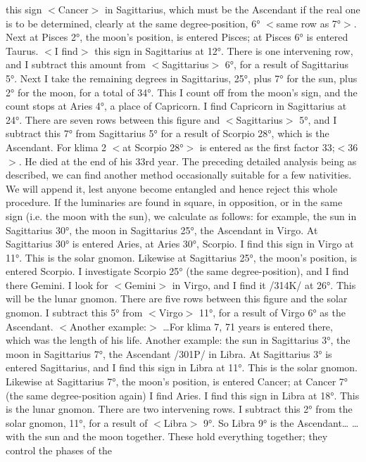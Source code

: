 this sign $<$Cancer$>$ in Sagittarius, which must be the Ascendant if the real one is to be determined, clearly
at the same degree-position, 6° $<$same row as 7°$>$. Next at Pisces 2°, the moon’s position, is entered
Pisces; at Pisces 6° is entered Taurus. $<$I find$>$ this sign in Sagittarius at 12°. There is one intervening
row, and I subtract this amount from $<$Sagittarius$>$ 6°, for a result of Sagittarius 5°. Next I take the
remaining degrees in Sagittarius, 25°, plus 7° for the sun, plus 2° for the moon, for a total of 34°. This I
count off from the moon’s sign, and the count stops at Aries 4°, a place of Capricorn. I find Capricorn in
Sagittarius at 24°. There are seven rows between this figure and $<$Sagittarius$>$ 5°, and I subtract this 7°
from Sagittarius 5° for a result of Scorpio 28°, which is the Ascendant. For klima 2 $<$at Scorpio 28°$>$ is
entered as the first factor 33;$<$36$>$. He died at the end of his 33rd year.
The preceding detailed analysis being as described, we can find another method occasionally suitable
for a few nativities. We will append it, lest anyone become entangled and hence reject this whole
procedure. If the luminaries are found in square, in opposition, or in the same sign (i.e. the moon with the
sun), we calculate as follows: for example, the sun in Sagittarius 30°, the moon in Sagittarius 25°, the
Ascendant in Virgo. At Sagittarius 30° is entered Aries, at Aries 30°, Scorpio. I find this sign in Virgo at
11°. This is the solar gnomon. Likewise at Sagittarius 25°, the moon’s position, is entered Scorpio. I
investigate Scorpio 25° (the same degree-position), and I find there Gemini. I look for $<$Gemini$>$ in Virgo,
and I find it /314K/ at 26°. This will be the lunar gnomon. There are five rows between this figure and
the solar gnomon. I subtract this 5° from $<$Virgo$>$ 11°, for a result of Virgo 6° as the Ascendant.
$<$Another example:$>$ …For klima 7, 71 years is entered there, which was the length of his life.
Another example: the sun in Sagittarius 3°, the moon in Sagittarius 7°, the Ascendant /301P/ in
Libra. At Sagittarius 3° is entered Sagittarius, and I find this sign in Libra at 11°. This is the solar
gnomon. Likewise at Sagittarius 7°, the moon’s position, is entered Cancer; at Cancer 7° (the same
degree-position again) I find Aries. I find this sign in Libra at 18°. This is the lunar gnomon. There are
two intervening rows. I subtract this 2° from the solar gnomon, 11°, for a result of $<$Libra$>$ 9°. So Libra
9° is the Ascendant…
…with the sun and the moon together. These hold everything together; they control the phases of the
